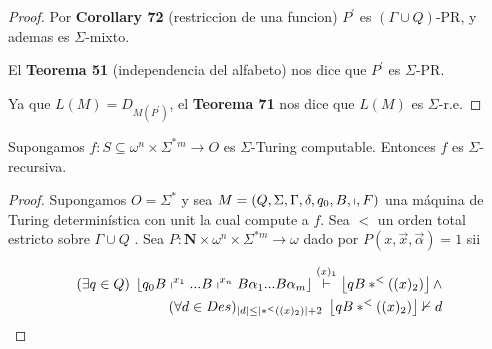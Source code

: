 \begin{theorem}
\begin{proof}
    \noindent Por \textbf{Corollary 72} (restriccion de una funcion) $P^{\prime }$ es $(\Gamma \cup Q)$-PR,
    y ademas es $\Sigma $-mixto.

    \noindent El \textbf{Teorema 51} (independencia del alfabeto) nos dice que $P^{\prime }$ es $\Sigma $-PR.

    \noindent Ya que $ L(M)=D_{M(P^{\prime })}$, el \textbf{Teorema 71} nos dice que $ L(M)$ es $\Sigma $-r.e.
  \end{proof}
  \end{theorem}

	\begin{theorem}
		Supongamos $f:S\subseteq \omega ^{n}\times \Sigma ^{\ast }{}^{m}\rightarrow O $ es
    $\Sigma $-Turing computable. Entonces $f$ es $\Sigma $-recursiva.
	\begin{proof}
    Supongamos $O=\Sigma ^{\ast }$ y sea $M=\left( Q,\Sigma ,\Gamma ,\delta ,q_{0},B,\shortmid ,F\right) $
    una máquina de Turing determinística con unit la cual compute a $f$. Sea $< $ un orden total estricto sobre
    $\Gamma \cup Q$ . Sea $P:\mathbf{N}\times \omega ^{n}\times \Sigma ^{\ast m}\rightarrow \omega $ dado por
    $P(x,\vec{x},\vec{\alpha})=1$ sii

    \begin{eqnarray*}
      (\exists q\in Q)\;
        \left\lfloor q_{0}B\shortmid ^{x_{1}}...B\shortmid ^{x_{n}}B\alpha _{1}...B\alpha _{m}\right\rfloor
        \overset{(x)_{1}}{\vdash }
        \left\lfloor qB\ast ^{< }((x)_{2})\right\rfloor \wedge \\
       (\forall d\in Des)
         _{\left\vert d\right\vert \leq \left\vert \ast ^{< }((x)_{2})\right\vert +2}\;
         \left\lfloor qB\ast ^{< }((x)_{2})\right\rfloor \nvdash d
    \end{eqnarray*}


\end{proof}
\end{theorem}
